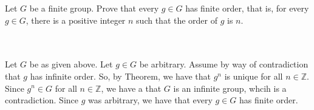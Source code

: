 Let $G$ be a finite group. Prove that every $g\in G$ has finite order, that is, for every $g\in G$,
there is a positive integer $n$ such that the order of $g$ is $n$.\\\\

\begin{solution}\renewcommand{\qedsymbol}{}\ \\
    Let $G$ be as given above. Let $g\in G$ be arbitrary. Assume by way of contradiction that $g$ has
    infinite order. So, by Theorem, we have that $g^n$ is unique for all $n\in\mathbb{Z}$. Since
    $g^n\in G$ for all $n\in\mathbb{Z}$, we have a that $G$ is an infinite group, whcih is a
    contradiction. Since $g$ was arbitrary, we have that every $g\in G$ has finite order.

\end{solution}